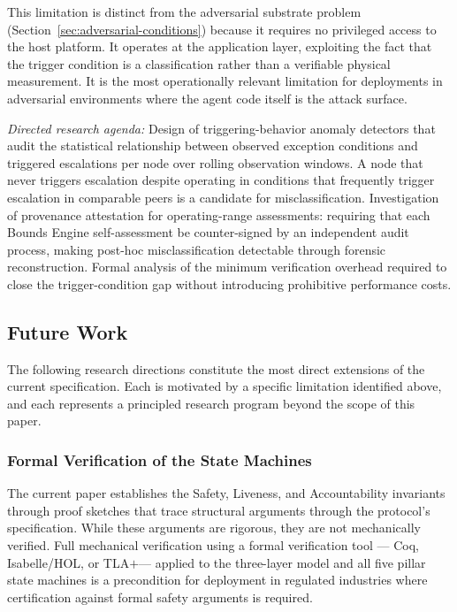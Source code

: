 This limitation is distinct from the adversarial substrate problem
(Section~\ref{sec:adversarial-conditions}) because it requires no privileged
access to the host platform.  It operates at the application layer, exploiting
the fact that the trigger condition is a classification rather than a
verifiable physical measurement.  It is the most operationally relevant
limitation for deployments in adversarial environments where the agent code
itself is the attack surface.

\textit{Directed research agenda:} Design of triggering-behavior anomaly
detectors that audit the statistical relationship between observed exception
conditions and triggered escalations per node over rolling observation windows.
A node that never triggers escalation despite operating in conditions that
frequently trigger escalation in comparable peers is a candidate for
misclassification.  Investigation of provenance attestation for operating-range
assessments: requiring that each Bounds Engine self-assessment be
counter-signed by an independent audit process, making post-hoc
misclassification detectable through forensic reconstruction.  Formal analysis
of the minimum verification overhead required to close the trigger-condition
gap without introducing prohibitive performance costs.

\subsection{Future Work}\label{sec:future-work}

The following research directions constitute the most direct extensions of the
current specification.  Each is motivated by a specific limitation identified
above, and each represents a principled research program beyond the scope of
this paper.

\subsubsection{Formal Verification of the \bxthree{} State Machines}\label{sec:formal-verification}

The current paper establishes the Safety, Liveness, and Accountability
invariants through proof sketches that trace structural arguments through the
protocol's specification.  While these arguments are rigorous, they are not
mechanically verified.  Full mechanical verification using a formal
verification tool --- Coq, Isabelle/HOL, or TLA$+$\nolinebreak --- applied to
the \bxthree{} three-layer model and all five pillar state machines is a
precondition for deployment in regulated industries where certification against
formal safety arguments is required.

